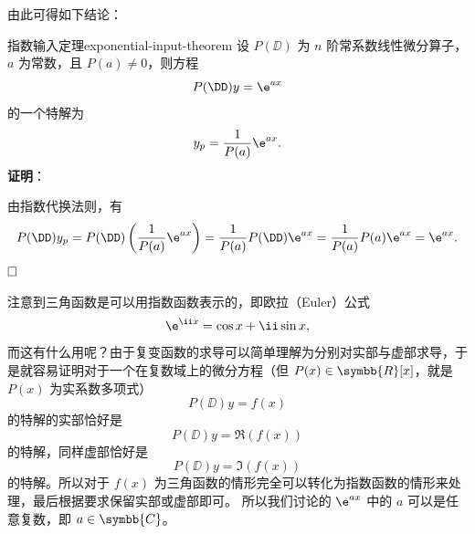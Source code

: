 由此可得如下结论：
\begin{theorem}{指数输入定理}{exponential-input-theorem}
    设 $ P(\DD) $ 为 $ n $ 阶常系数线性微分算子，$ a $ 为常数，且 $ P(a) \neq 0 $，则方程
    \begin{equation*}
        P(\DD) y = \e^{ax}
    \end{equation*}
    的一个特解为
    \begin{equation}
        y_p = \frac{1}{P(a)} \e^{ax} .
    \end{equation}
    \textbf{证明}：

    由指数代换法则，有
    \begin{equation*}
        P(\DD) y_p = P(\DD) \left( \frac{1}{P(a)} \e^{ax} \right) = \frac{1}{P(a)} P(\DD) \e^{ax} = \frac{1}{P(a)} P(a) \e^{ax} = \e^{ax} .
    \end{equation*}
    $\hfill\square$
\end{theorem}

注意到三角函数是可以用指数函数表示的，即欧拉（Euler）公式
\begin{equation}
    \e^{\ii x} = \cos x + \ii \sin x ,
\end{equation}
而这有什么用呢？由于复变函数的求导可以简单理解为分别对实部与虚部求导，于是就容易证明对于一个在复数域上的微分方程（但 $ P(x) \in \symbb{R}[x] $，就是 $ P (x) $ 为实系数多项式）
\begin{equation}
    P(\DD) y = f (x)
\end{equation}
的特解的实部恰好是
\begin{equation}
    P(\DD) y = \Re (f (x))
\end{equation}
的特解，同样虚部恰好是
\begin{equation}
    P(\DD) y = \Im (f (x))
\end{equation}
的特解。所以对于 $ f (x) $ 为三角函数的情形完全可以转化为指数函数的情形来处理，最后根据要求保留实部或虚部即可。
所以我们讨论的 $ \e^{ax} $ 中的 $ a $ 可以是任意复数，即 $ a \in \symbb{C} $。

